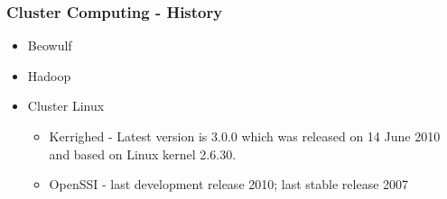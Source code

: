 \documentclass{beamer}
\begin{document}
\begin{frame}
\frametitle{Cluster Computing - History}
\begin{itemize}
\item Beowulf
\item Hadoop
\item Cluster Linux
\begin{itemize}
\item Kerrighed - Latest version is 3.0.0 which was released on 14 June 2010 and based on Linux kernel 2.6.30.
\item OpenSSI - last development release 2010; last stable release 2007
\end{itemize}
\end{itemize}
\end{frame}

\begin{comment}
\begin{frame}[fragile]
\begin{semiverbatim}
\tiny
import java.io.IOException;
import java.util.StringTokenizer;

import org.apache.hadoop.conf.Configuration;
import org.apache.hadoop.fs.Path;
import org.apache.hadoop.io.IntWritable;
import org.apache.hadoop.io.Text;
import org.apache.hadoop.mapreduce.Job;
import org.apache.hadoop.mapreduce.Mapper;
import org.apache.hadoop.mapreduce.Reducer;
import org.apache.hadoop.mapreduce.lib.input.FileInputFormat;
import org.apache.hadoop.mapreduce.lib.output.FileOutputFormat;

public class WordCount \{

  public static class TokenizerMapper
       extends Mapper<Object, Text, Text, IntWritable>\{

    private final static IntWritable one = new IntWritable(1);
    private Text word = new Text();

    public void map(Object key, Text value, Context context
                    ) throws IOException, InterruptedException \{
      StringTokenizer itr = new StringTokenizer(value.toString());
      while (itr.hasMoreTokens()) \{
        word.set(itr.nextToken());
        context.write(word, one);
      \}
    \}
  \}

  public static class IntSumReducer
       extends Reducer<Text,IntWritable,Text,IntWritable> \{
    private IntWritable result = new IntWritable();

    public void reduce(Text key, Iterable<IntWritable> values,
                       Context context
                       ) throws IOException, InterruptedException \{
      int sum = 0;
      for (IntWritable val : values) \{
        sum += val.get();
      \}
      result.set(sum);
      context.write(key, result);
    \}
  \}


\end{comment}
\end{document}
